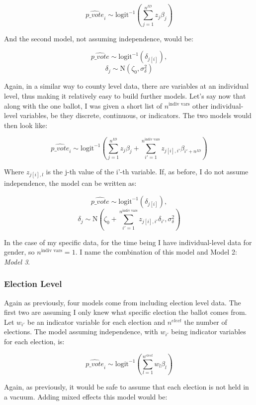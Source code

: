 \documentclass[12pt,twoside]{reedthesis}
\begin{document}
  \[\hat{p\_vote}_i \sim \text{logit}^{-1}(\sum_{j = 1}^{n^{ID}}z_{j}\beta_{j})\]
  
  And the second model, not assuming independence, would be:
  
  \[\hat{p\_vote} \sim \text{logit}^{-1}(\delta_{j[i]}), \]
  \[\delta_{j} \sim \text{N}(\zeta_0, \sigma_{\delta}^2)\]
  
  Again, in a similar way to county level data, there are variables at an
  individual level, thus making it relatively easy to build further
  models. Let's say now that along with the one ballot, I was given a
  short list of \(n^{\text{indiv vars}}\) other individual-level
  variables, be they discrete, continuous, or indicators. The two models
  would then look like:
  
  \[\hat{p\_vote}_i \sim \text{logit}^{-1}(\sum_{j = 1}^{n^{ID}}z_{j}\beta_{j} + \sum_{i'=1}^{n^{\text{indiv vars}}}z_{j[i], i'}\beta_{i'+n^{ID}})\]
  
  Where \(z_{j[i], l}\) is the j-th value of the i'-th variable. If, as
  before, I do not assume independence, the model can be written as:
  
  \[\hat{p\_vote} \sim \text{logit}^{-1}(\delta_{j[i]}), \]
  \[\delta_{j} \sim \text{N}(\zeta_0 + \sum_{i'=1}^{n^{\text{indiv vars}}}z_{j[i], i'}\delta_{i'}, \sigma_{\delta}^2)\]
  
  In the case of my specific data, for the time being I have
  individual-level data for gender, so \(n^{\text{indiv vars}} = 1\). I
  name the combination of this model and Model 2: \emph{Model 3}.
  
  \subsubsection{Election Level}\label{election-level}
  
  Again as previously, four models come from including election level
  data. The first two are assuming I only knew what specific election the
  ballot comes from. Let \(w_{i'}\) be an indicator variable for each
  election and \(n^{elect}\) the number of elections. The model assuming
  independence, with \(w_{i'}\) being indicator variables for each
  election, is:
  
  \[\hat{p\_vote}_i \sim \text{logit}^{-1}(\sum_{l = 1}^{n^{elect}}w_{l}\beta_{l})\]
  
  Again, as previously, it would be safe to assume that each election is
  not held in a vacuum. Adding mixed effects this model would be:
  
\end{document}
